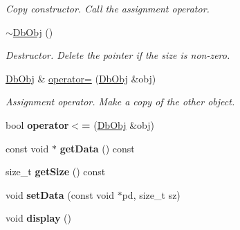 \begin{CompactItemize}
\begin{CompactList}\small\item\em Copy constructor. Call the assignment operator. \item\end{CompactList}\item 
\hypertarget{classutil_1_1DbObj_19e815572aa7cfd9e46f28d5773249d4}{
\hyperlink{classutil_1_1DbObj_19e815572aa7cfd9e46f28d5773249d4}{$\sim$DbObj} ()}
\label{classutil_1_1DbObj_19e815572aa7cfd9e46f28d5773249d4}

\begin{CompactList}\small\item\em Destructor. Delete the pointer if the size is non-zero. \item\end{CompactList}\item 
\hypertarget{classutil_1_1DbObj_c31df94831fa0bd0fe3985dc7b75a537}{
\hyperlink{classutil_1_1DbObj}{DbObj} \& \hyperlink{classutil_1_1DbObj_c31df94831fa0bd0fe3985dc7b75a537}{operator=} (\hyperlink{classutil_1_1DbObj}{DbObj} \&obj)}
\label{classutil_1_1DbObj_c31df94831fa0bd0fe3985dc7b75a537}

\begin{CompactList}\small\item\em Assignment operator. Make a copy of the other object. \item\end{CompactList}\item 
\hypertarget{classutil_1_1DbObj_73bd7141e5cbb5dd8541a499d05b491f}{
bool \textbf{operator$<$=} (\hyperlink{classutil_1_1DbObj}{DbObj} \&obj)}
\label{classutil_1_1DbObj_73bd7141e5cbb5dd8541a499d05b491f}

\item 
\hypertarget{classutil_1_1DbObj_259462777be63c2c7f7aa17b57cd6294}{
const void $\ast$ \textbf{getData} () const }
\label{classutil_1_1DbObj_259462777be63c2c7f7aa17b57cd6294}

\item 
\hypertarget{classutil_1_1DbObj_46671534c7545b9a908838e82b7ec266}{
size\_\-t \textbf{getSize} () const }
\label{classutil_1_1DbObj_46671534c7545b9a908838e82b7ec266}

\item 
\hypertarget{classutil_1_1DbObj_1c4f5599227873c8116b4ceed4f17999}{
void \textbf{setData} (const void $\ast$pd, size\_\-t sz)}
\label{classutil_1_1DbObj_1c4f5599227873c8116b4ceed4f17999}

\item 
\hypertarget{classutil_1_1DbObj_b37c5a97bac8d4ba8a2ea3d8c3f02db9}{
void \textbf{display} ()}
\label{classutil_1_1DbObj_b37c5a97bac8d4ba8a2ea3d8c3f02db9}

\end{CompactItemize}


